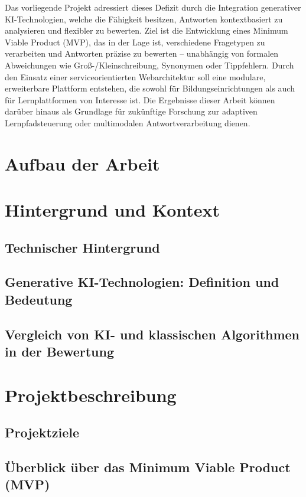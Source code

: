 \documentclass[a4paper,12pt]{article}
\begin{document}
Das vorliegende Projekt adressiert dieses Defizit durch die Integration generativer KI-Technologien, welche die Fähigkeit besitzen, Antworten kontextbasiert zu analysieren und flexibler zu bewerten. Ziel ist die Entwicklung eines Minimum Viable Product (MVP), das in der Lage ist, verschiedene Fragetypen zu verarbeiten und Antworten präzise zu bewerten – unabhängig von formalen Abweichungen wie Groß-/Kleinschreibung, Synonymen oder Tippfehlern. Durch den Einsatz einer serviceorientierten Webarchitektur soll eine modulare, erweiterbare Plattform entstehen, die sowohl für Bildungseinrichtungen als auch für Lernplattformen von Interesse ist. Die Ergebnisse dieser Arbeit können darüber hinaus als Grundlage für zukünftige Forschung zur adaptiven Lernpfadsteuerung oder multimodalen Antwortverarbeitung dienen.

\section{Aufbau der Arbeit}

\newpage

\section{Hintergrund und Kontext}
\subsection{Technischer Hintergrund}
\subsection{Generative KI-Technologien: Definition und Bedeutung}
\subsection{Vergleich von KI- und klassischen Algorithmen in der Bewertung}

\newpage

\section{Projektbeschreibung}
\subsection{Projektziele}
\subsection{Überblick über das Minimum Viable Product (MVP)}
\end{document}
